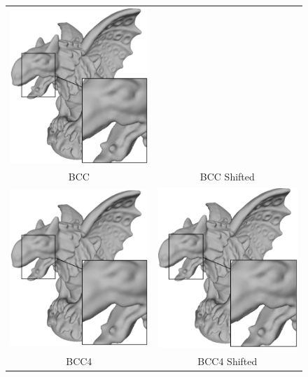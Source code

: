 \begin{figure}
\begin{tabular}{c c}
		\includegraphics[width=0.48\linewidth,natwidth=750,natheight=750]{images/gargoyle/bccs.eps} \\ 
		BCC & BCC Shifted \\ 
		\includegraphics[width=0.49\linewidth,natwidth=750,natheight=750]{images/gargoyle/bcc4.eps} &
		\includegraphics[width=0.49\linewidth,natwidth=750,natheight=750]{images/gargoyle/bcc4s.eps} \\
		BCC4 & BCC4 Shifted \\ 

\end{tabular}
\end{figure}
